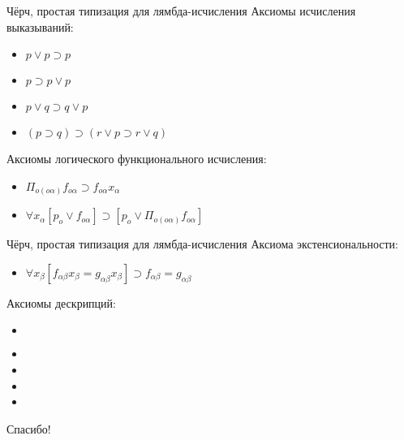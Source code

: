 \documentclass{beamer}
\begin{document}
\begin{frame}{Чёрч, простая типизация для лямбда-исчисления}
Аксиомы исчисления выказываний:\\
\begin{itemize}
  \item $p \vee p \supset p$
  \item $p \supset p \vee p$
  \item $p \vee q \supset q \vee p$
  \item $(p \supset q) \supset (r \vee p \supset r \vee q)$
\end{itemize}
\bigskip
Аксиомы логического функционального исчисления:\\
\begin{itemize}
  \item $\Pi_{o (o \alpha)} f_{o \alpha} \supset f_{o \alpha} x_\alpha$
  \item $\forall x_\alpha [p_o \vee f_{o \alpha}] \supset [p_o \vee \Pi_{o(o \alpha)} f_{o \alpha}]$
\end{itemize}
\end{frame}

\begin{frame}{Чёрч, простая типизация для лямбда-исчисления}
Аксиома экстенсиональности:\\
\bigskip
\begin{itemize}
  \item $\forall x_\beta [f_{\alpha \beta} x_\beta = g_{\alpha \beta} x_\beta] \supset f_{\alpha \beta} = g_{\alpha \beta}$
\end{itemize}
\bigskip
Аксиомы дескрипций:\\
\begin{itemize}
  \item $$
  \item 
  \item 
  \item 
  \item 
\end{itemize}
\end{frame}


\begin{frame}{}
    \thispagestyle{empty}
    \begin{center}
        {\large Спасибо!}
    \end{center}
\end{frame}


\end{document}
